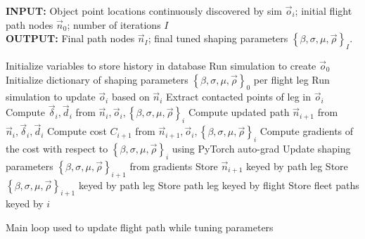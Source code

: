 \documentclass[conf]{new-aiaa}
\begin{document}
\begin{algorithm}
\textbf{INPUT:} Object point locations continuously discovered by sim $\vec{o}_i$; initial flight path nodes $\vec{n}_0$; number of iterations $I$\\
\textbf{OUTPUT:} Final path nodes $\vec{n}_I$; final tuned shaping parameters $\left\{\beta, \sigma, \mu, \vec{\rho}\right\}_I$.
\begin{algorithmic}
\STATE Initialize variables to store history in database
\STATE Run simulation to create $\vec{o}_0$
\STATE Initialize dictionary of shaping parameters $\left\{\beta, \sigma, \mu, \vec{\rho}\right\}_0$ per flight leg
\STATE Run simulation to update $\vec{o}_i$ based on $\vec{n}_i$
\STATE Extract contacted points of leg in $\vec{o}_i$
\STATE Compute $\vec{\delta}_i, \vec{d}_i$ from $\vec{n}_i, \vec{o}_i, \left\{\beta, \sigma, \mu, \vec{\rho}\right\}_i$
\STATE Compute updated path $\vec{n}_{i + 1}$ from $\vec{n}_i, \vec{\delta}_i, \vec{d}_i$
\STATE Compute cost $C_{i + 1}$ from $\vec{n}_{i + 1}, \vec{o}_i, \left\{\beta, \sigma, \mu, \vec{\rho}\right\}_i$
\STATE Compute gradients of the cost with respect to $\left\{\beta, \sigma, \mu, \vec{\rho}\right\}_i$ using PyTorch auto-grad
\STATE Update shaping parameters $\left\{\beta, \sigma, \mu, \vec{\rho}\right\}_{i + 1}$ from gradients
\ENDIF
\STATE Store $\vec{n}_{i + 1}$ keyed by path leg
\STATE Store $\left\{\beta, \sigma, \mu, \vec{\rho}\right\}_{i + 1}$ keyed by path leg
\ENDFOR
\STATE Store path leg keyed by flight
\ENDFOR
\STATE Store fleet paths keyed by $i$
\ENDFOR
\end{algorithmic}
\caption{Main loop used to update flight path while tuning parameters}
\label{algo:relgraph}
\end{algorithm}




\end{document}
